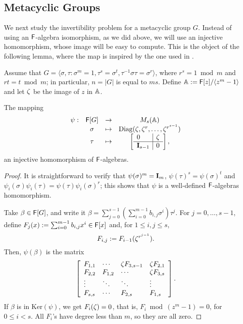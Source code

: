 
\subsection{Metacyclic Groups}

We next study the invertibility problem for a
metacyclic group $G$. Instead of using an ${\mathsf{F}}$-algebra isomorphism, as
we did above, we will use an injective homomorphism, whose image will
be easy to compute. This is the object of the following lemma, where
the map is inspired by the one used in \cite[\S 47]{Curtis}.

Assume that $G = \langle \sigma , \tau : \sigma^m = 1, \tau^s =
\sigma^t, \tau^{-1} \sigma \tau = \sigma^r \rangle$, where $r^s = 1
\bmod m$ and $rt = t \bmod m$; in particular, $n=|G|$ is equal to
$ms$. Define $\mathbb{A}:={\mathsf{F}}[z]/\langle z^m-1\rangle$ and let $\zeta$ be the
image of $z$ in $\mathbb{A}$.

\begin{lemma}\label{prop:metinjection}
The mapping
\[
  \begin{array}{cccc}
\psi:& \F [G]& \to& M_s(\A) \\
&\sigma &\mapsto& \mathrm{Diag}(\zbar, \zbar^r , \ldots, \zbar^{r^{s-1}})\\
&\tau &\mapsto &
\left[ \begin{array}{l|l}
0 & \zbar\\
\hline
\mat I_{s-1} & 0
\end{array}
\right],
  \end{array}
\]
an injective homomorphism of ${\mathsf{F}}$-algebras.
\end{lemma}
\begin{proof}
It is straightforward to verify that $\psi(\sigma)^m = \mat I_m$,
$\psi(\tau)^s = \psi(\sigma)^t$ and $\psi_i(\sigma) \psi_i(\tau)
=\psi(\tau) \psi_i(\sigma)^r$; this shows that $\psi$ is a well-defined ${\mathsf{F}}$-algebras homomorphism.

Take $\beta \in {\mathsf{F}}[G]$, and write it $\beta = \sum_{j = 0}^{s-1}
\left( \sum_{i = 0}^{m-1} b_{i,j} \sigma^i \right) \tau^j$. For
$j=0,\dots,s-1$, define $F_j(x) := \sum_{i = 0}^{m-1} b_{i,j}x^i \in
{\mathsf{F}}[x]$ and, for $1 \leq i,j \leq s$,
$$F_{i,j} := F_{i-1}(\zeta^{r^{j-1}}).$$
Then, $\psi(\beta)$ is the matrix
\begin{equation}\label{eq:injection}
\left[\begin{array}{llll}
F_{1,1} &  \cdots	&	\zeta F_{3,s-1} & \zeta F_{2,1}\\
F_{2,2} & F_{1,2}& \cdots & \zeta F_{3,s}\\
\vdots &\ddots & \ddots& \vdots\\
F_{s,s}& \cdots & F_{2,s}	& F_{1,s}
\end{array}
\right].
\end{equation}
If $\beta$ is in $\mathrm{Ker}(\psi)$, we get $F_i(\zeta) =0$, that is,
$F_i \bmod (z^m-1)=0$, for $0 \leq i < s$.  All $F_i$'s have degree 
less than $m$, so they are all zero.
\end{proof}

